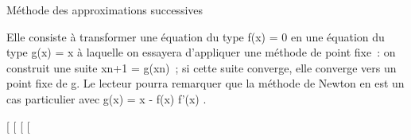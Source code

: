 Méthode des approximations successives

Elle consiste à transformer une équation du type f(x) = 0 en une
équation du type g(x) = x à laquelle on essayera d'appliquer une méthode
de point fixe~: on construit une suite xn+1 =
g(xn)~; si cette suite converge, elle converge vers un point
fixe de g. Le lecteur pourra remarquer que la méthode de Newton en est
un cas particulier avec g(x) = x - f(x) \over f'(x) .

{[}
{[}
{[}
{[}
